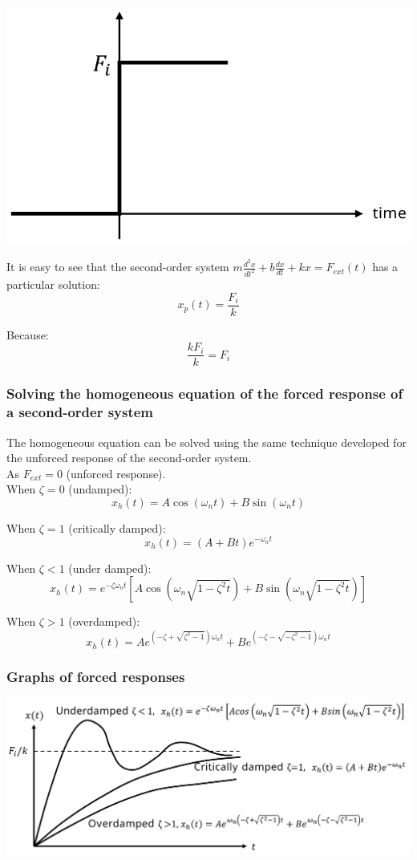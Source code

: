 \documentclass[11pt]{article}
\begin{document}
\begin{center}
\includegraphics[width=.9\linewidth]{./images/forced-response-step-input-graph.png}
\end{center}

It is easy to see that the second-order system \(m \frac{d^2 x}{dt^2} + b \frac{dx}{dt} + kx = F_{ext} (t)\) has a particular solution:
\[x_p (t) = \frac{F_i}{k}\]

Because:
\[\frac{k F_i}{k} = F_i\]
\subsubsection{Solving the homogeneous equation of the forced response of a second-order system}
\label{sec:orged8ce38}
The homogeneous equation can be solved using the same technique developed for the unforced response of the second-order system.  \\

As \(F_{ext} = 0\) (unforced response).  \\

When \(\zeta = 0\) (undamped):
\[x_h (t) = A \cos(\omega_n t) + B \sin(\omega_n t)\]

When \(\zeta = 1\) (critically damped):
\[x_h (t) = (A + Bt) e^{- \omega_n t}\]

When \(\zeta < 1\) (under damped):
\[x_h(t) = e^{-\zeta \omega_n t} \left[A \cos \left(\omega_n \sqrt{1 - \zeta^2 t} \right) + B \sin \left(\omega_n \sqrt{1 - \zeta^2 t} \right) \right]\]

When \(\zeta > 1\) (overdamped):
\[x_h (t) = Ae^{\left(- \zeta + \sqrt{\zeta^2 - 1} \right) \omega_n t} + Be^{\left( -\zeta - \sqrt{- \zeta^2 - 1} \right) \omega_n t}\]
\subsubsection{Graphs of forced responses}
\label{sec:orge935cff}
\begin{center}
\includegraphics[width=.9\linewidth]{./images/forced-response-damping-graph.png}
\end{center}
\end{document}

